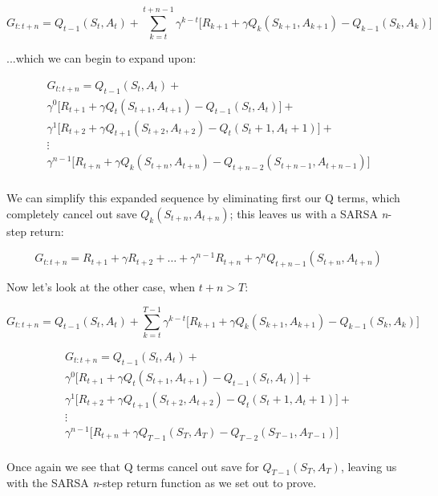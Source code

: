 \documentclass{article}
\begin{document}
\begin{equation}
    G_{t:t+n} = Q_{t-1}(S_t, A_t) + \sum^{t+n-1}_{k=t} \gamma^{k-t} \biggr[ R_{k+1} + \gamma Q_k(S_{k+1}, A_{k+1}) - Q_{k-1}(S_k, A_k) \biggl]
\end{equation}

...which we can begin to expand upon:

\begin{equation}
    \begin{aligned}
        G_{t:t+n} = Q_{t-1}(S_t, A_t) +                                                                       \\
        \gamma^{0} \biggr[ R_{t+1} + \gamma Q_{t}(S_{t+1}, A_{t+1}) - Q_{t-1}(S_t, A_t) \biggl] +             \\
        \gamma^{1} \biggr[ R_{t+2} + \gamma Q_{t+1}(S_{t+2}, A_{t+2}) - Q_{t}(S_t+1, A_t+1) \biggl] +         \\
        \vdots                                                                                                \\
        \gamma^{n-1} \biggr[ R_{t+n} + \gamma Q_k(S_{t+n}, A_{t+n}) - Q_{t+n-2}(S_{t+n-1}, A_{t+n-1}) \biggl] \\
    \end{aligned}
\end{equation}

We can simplify this expanded sequence by eliminating first our Q terms, which completely cancel out save $Q_k(S_{t+n}, A_{t+n})$; this leaves us with a SARSA \textit{n}-step return:

\begin{equation}
    G_{t:t+n} = R_{t+1}+\gamma R_{t+2} + \dots + \gamma^{n-1} R_{t+n} + \gamma^n Q_{t+n-1} (S_{t+n}, A_{t+n})
\end{equation}

Now let's look at the other case, when $t+n> T$:

\begin{equation}
    G_{t:t+n} = Q_{t-1}(S_t, A_t) + \sum^{T-1}_{k=t} \gamma^{k-t} \biggr[ R_{k+1} + \gamma Q_k(S_{k+1}, A_{k+1}) - Q_{k-1}(S_k, A_k) \biggl]
\end{equation}

\begin{equation}
    \begin{aligned}
        G_{t:t+n} = Q_{t-1}(S_t, A_t) +                                                                 \\
        \gamma^{0} \biggr[ R_{t+1} + \gamma Q_t(S_{t+1}, A_{t+1}) - Q_{t-1}(S_t, A_t) \biggl] +         \\
        \gamma^{1} \biggr[ R_{t+2} + \gamma Q_{t+1}(S_{t+2}, A_{t+2}) - Q_{t}(S_t+1, A_t+1) \biggl] +   \\
        \vdots                                                                                          \\
        \gamma^{n-1} \biggr[ R_{t+n} + \gamma Q_{T-1}(S_{T}, A_{T}) - Q_{T-2}(S_{T-1}, A_{T-1}) \biggl] \\
    \end{aligned}
\end{equation}

Once again we see that Q terms cancel out save for $Q_{T-1}(S_{T}, A_{T})$, leaving us with the SARSA \textit{n}-step return function as we set out to prove.
\end{document}
